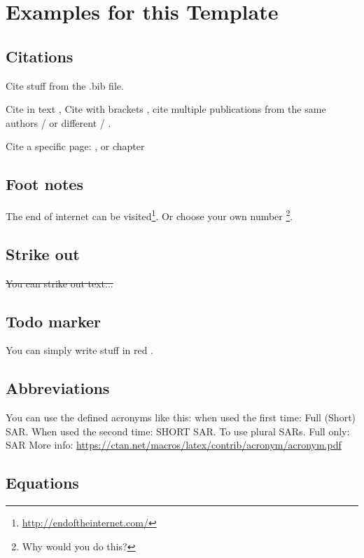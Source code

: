 
\chapter{Examples for this Template}
\section{Citations}
Cite stuff from the .bib file. 

Cite in text \cite{CostantiniPSP}, Cite with brackets \citep{Schneider2021b}, cite multiple publications from the same authors \cite{Schneider2021b,Schneider2021a} / \citep{Schneider2021b,Schneider2021a} or different \citep{Schneider2021b,CostantiniPSP} / \cite{Schneider2021b,CostantiniPSP}. 

Cite a specific page:  \cite[see][page]{Schneider2021b}, or chapter \cite[compare ][p. 42]{Schneider2021a} 

\section{Foot notes}
The end of internet can be visited\footnote{\url{http://endoftheinternet.com/}}. 
Or choose your own number \footnote[42]{Why would you do this?}.

\section{Strike out}

\sout{You can strike out text...}
\section{Todo marker}

You can simply write stuff in red .

\section{Abbreviations} 
You can use the defined acronyms like this: when used the first time: Full (Short) \ac{SAR}. When used the second time: SHORT \ac{SAR}. To use plural \acp{SAR}. Full only: \acl{SAR}
More info: \url{https://ctan.net/macros/latex/contrib/acronym/acronym.pdf}

\section{Equations} 

